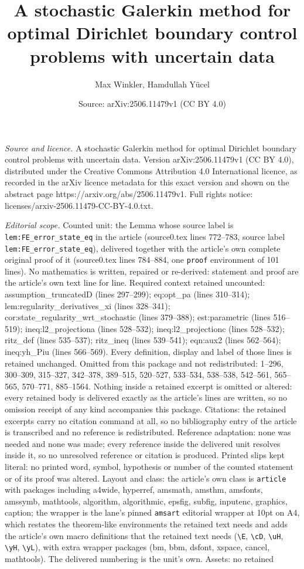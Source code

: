 \documentclass[10pt,a4paper]{amsart}
\title[A stochastic Galerkin method for optimal Dirichlet boundary ]{A stochastic Galerkin method for optimal Dirichlet boundary control problems with uncertain data}
\author{Max Winkler, Hamdullah Y\"ucel}
\date{Source: arXiv:2506.11479v1 (CC BY 4.0)}
\begin{document}
\maketitle

\noindent\emph{Source and licence.} A stochastic Galerkin method for optimal Dirichlet boundary control problems with uncertain data. Version arXiv:2506.11479v1 (CC BY 4.0), distributed under the Creative Commons Attribution 4.0 International licence, as recorded in the arXiv licence metadata for this exact version and shown on the abstract page https://arxiv.org/abs/2506.11479v1. Full rights notice: licenses/arxiv-2506.11479-CC-BY-4.0.txt.\par\smallskip

\noindent\textit{Editorial scope.} Counted unit: the Lemma whose source label is \texttt{lem:FE\_error\_state\_eq} in the article (source0.tex lines 772--783, source label \texttt{lem:FE\_error\_state\_eq}), delivered together with the article's own complete original proof of it (source0.tex lines 784--884, one \texttt{proof} environment of 101 lines). No mathematics is written, repaired or re-derived: statement and proof are the article's own text line for line. Required context retained uncounted: assumption\_truncatedD (lines 297--299); eq:opt\_pa (lines 310--314); lem:regularity\_derivatives\_xi (lines 328--341); cor:state\_regularity\_wrt\_stochastic (lines 379--388); est:parametric (lines 516--519); ineq:l2\_projectiona (lines 528--532); ineq:l2\_projectionc (lines 528--532); ritz\_def (lines 535--537); ritz\_ineq (lines 539--541); eqn:aux2 (lines 562--564); ineq:yh\_Piu (lines 566--569). Every definition, display and label of those lines is retained unchanged. Omitted from this package and not redistributed: 1--296, 300--309, 315--327, 342--378, 389--515, 520--527, 533--534, 538--538, 542--561, 565--565, 570--771, 885--1564. Nothing inside a retained excerpt is omitted or altered: every retained body is delivered exactly as the article's lines are written, so no omission receipt of any kind accompanies this package. Citations: the retained excerpts carry no citation command at all, so no bibliography entry of the article is transcribed and no reference is redistributed. Reference adaptation: none was needed and none was made; every reference inside the delivered unit resolves inside it, so no unresolved reference or citation is produced. Printed slips kept literal: no printed word, symbol, hypothesis or number of the counted statement or of its proof was altered. Layout and class: the article's own class is \texttt{article} with packages including a4wide, hyperref, amsmath, amsthm, amsfonts, amssymb, mathtools, algorithm, algorithmic, epsfig, subfig, inputenc, graphics, caption; the wrapper is the lane's pinned \texttt{amsart} editorial wrapper at 10pt on A4, which restates the theorem-like environments the retained text needs and adds the article's own macro definitions that the retained text needs (\texttt{\textbackslash E}, \texttt{\textbackslash cD}, \texttt{\textbackslash uH}, \texttt{\textbackslash yH}, \texttt{\textbackslash yL}), with extra wrapper packages (bm, bbm, dsfont, xspace, cancel, mathtools). The delivered numbering is the unit's own. Assets: no retained 
\end{document}
